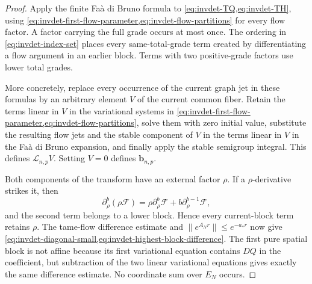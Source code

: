 \begin{proof}
Apply the finite Fa\`a di Bruno formula to
\cref{eq:invdet-TQ,eq:invdet-TH}, using
\cref{eq:invdet-first-flow-parameter,eq:invdet-flow-partitions} for every
flow factor.  A factor carrying the full grade occurs at most once.  The
ordering in \cref{eq:invdet-index-set} places every same-total-grade term
created by differentiating a flow argument in an earlier block.  Terms with
two positive-grade factors use lower total grades.

More concretely, replace every occurrence of the current graph jet in these
formulas by an arbitrary element \(V\) of the current common fiber.  Retain
the terms linear in \(V\) in the variational systems in
\cref{eq:invdet-first-flow-parameter,eq:invdet-flow-partitions}, solve them
with zero initial value, substitute the resulting flow jets and the stable
component of \(V\) in the terms linear in \(V\) in the Fa\`a di Bruno
expansion, and finally apply the stable semigroup integral.  This defines
\(\mathscr L_{n,p}V\).  Setting \(V=0\) defines
\(\mathbf b_{n,p}\).

Both components of the transform have an external factor \(\rho\).  If a
\(\rho\)-derivative strikes it, then
\begin{equation}
 \partial_\rho^b(\rho\mathcal F)
 =\rho\partial_\rho^b\mathcal F
   +b\partial_\rho^{b-1}\mathcal F,                  \label{eq:invdet-rho-Leibniz}
\end{equation}
and the second term belongs to a lower block.  Hence every current-block
term retains \(\rho\).  The tame-flow difference estimate and
\(\|e^{A_Nr}\|\leq e^{-a_*r}\) now give
\cref{eq:invdet-diagonal-small,eq:invdet-highest-block-difference}.  The
first pure spatial block is not affine because its first variational
equation contains \(DQ\) in the coefficient, but subtraction of the two
linear variational equations gives exactly the same difference estimate.
No coordinate sum over \(E_N\) occurs.
\end{proof}


